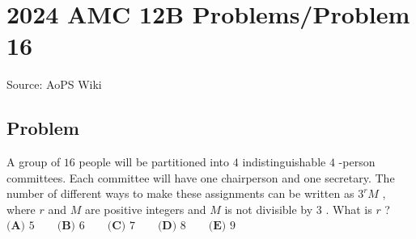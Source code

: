 \documentclass[12pt]{article}
\begin{document}
\section*{{2024 AMC 12B Problems/Problem 16}}
Source: AoPS Wiki

\subsection*{Problem}
A group of $16$ people will be partitioned into $4$ indistinguishable $4$ -person committees. Each committee will have one chairperson and one secretary. The number of different ways to make these assignments can be written as $3^{r}M$ , where $r$ and $M$ are positive integers and $M$ is not divisible by $3$ . What is $r$ ? $\textbf{(A) }5 \qquad \textbf{(B) }6 \qquad \textbf{(C) }7 \qquad \textbf{(D) }8 \qquad \textbf{(E) }9 \qquad$
\end{document}
